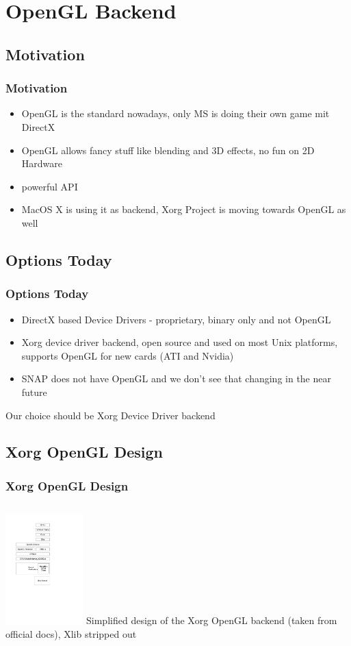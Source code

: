 \documentclass[handout]{beamer}
\begin{document}
\section{OpenGL Backend}

\subsection{Motivation}
\begin{frame}
\frametitle{Motivation}
	\begin{itemize}
      \item OpenGL is the standard nowadays, only MS is doing their own game mit DirectX
      \item OpenGL allows fancy stuff like blending and 3D effects, no fun on 2D Hardware
      \item powerful API
      \item MacOS X is using it as backend, Xorg Project is moving towards OpenGL as well
	\end{itemize}
\end{frame}

\subsection{Options Today}
\begin{frame}
\frametitle{Options Today}
	\begin{itemize}
      \item DirectX based Device Drivers - proprietary, binary only and not OpenGL
      \item Xorg device driver backend, open source and used on most Unix platforms, supports OpenGL for new cards (ATI and Nvidia)
      \item SNAP does not have OpenGL and we don't see that changing in the near future
    \end{itemize}
    Our choice should be Xorg Device Driver backend
\end{frame}

\subsection{Xorg OpenGL Design}
\begin{frame}
\frametitle{Xorg OpenGL Design}
	\begin{columns}
		\column[T]{5cm}
			\includegraphics[width=3cm]{ogl-backend.pdf}
		\column{5cm}
		 	Simplified design of the Xorg OpenGL backend (taken from official docs), Xlib stripped out
	\end{columns}
\end{frame}
\end{document}
